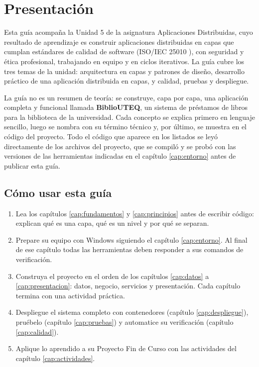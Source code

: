 \chapter{Presentación}

Esta guía acompaña la Unidad 5 de la asignatura Aplicaciones Distribuidas, cuyo resultado de aprendizaje es construir aplicaciones distribuidas en capas que cumplan estándares de calidad de software (ISO/IEC 25010 \cite{iso25010_2023}), con seguridad y ética profesional, trabajando en equipo y en ciclos iterativos. La guía cubre los tres temas de la unidad: arquitectura en capas y patrones de diseño, desarrollo práctico de una aplicación distribuida en capas, y calidad, pruebas y despliegue.

La guía no es un resumen de teoría: se construye, capa por capa, una aplicación completa y funcional llamada \textbf{BiblioUTEQ}, un sistema de préstamos de libros para la biblioteca de la universidad. Cada concepto se explica primero en lenguaje sencillo, luego se nombra con su término técnico y, por último, se muestra en el código del proyecto. Todo el código que aparece en los listados se leyó directamente de los archivos del proyecto, que se compiló y se probó con las versiones de las herramientas indicadas en el capítulo \ref{cap:entorno} antes de publicar esta guía.

\section*{Cómo usar esta guía}

\begin{enumerate}
	\item Lea los capítulos \ref{cap:fundamentos} y \ref{cap:principios} antes de escribir código: explican qué es una capa, qué es un nivel y por qué se separan.
	\item Prepare su equipo con Windows siguiendo el capítulo \ref{cap:entorno}. Al final de ese capítulo todas las herramientas deben responder a sus comandos de verificación.
	\item Construya el proyecto en el orden de los capítulos \ref{cap:datos} a \ref{cap:presentacion}: datos, negocio, servicios y presentación. Cada capítulo termina con una actividad práctica.
	\item Despliegue el sistema completo con contenedores (capítulo \ref{cap:despliegue}), pruébelo (capítulo \ref{cap:pruebas}) y automatice su verificación (capítulo \ref{cap:calidad}).
	\item Aplique lo aprendido a su Proyecto Fin de Curso con las actividades del capítulo \ref{cap:actividades}.
\end{enumerate}

